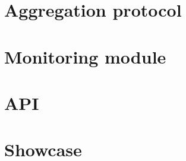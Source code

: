 \section{Aggregation protocol}
\label{sec:mon_protocol}


\section{Monitoring module}
\label{sec:mon_module}


\section{API}
\label{sec:api}


\section{Showcase}




